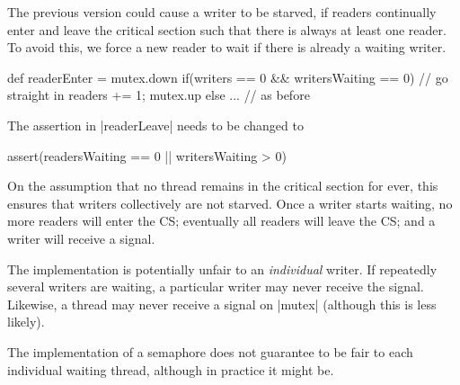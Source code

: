 
\begin{slide}

The previous version could cause a writer to be starved, if readers
continually enter and leave the critical section such that there is always at
least one reader.  To avoid this, we force a new reader to wait if there is
already a waiting writer.

\begin{scala}
  def readerEnter = {
    mutex.down
    if(writers == 0 && writersWaiting == 0){ // go straight in
      readers += 1; mutex.up
    }
    else{ ... } // as before
  }
\end{scala}

The assertion in |readerLeave| needs to be changed to 
\begin{scala}
  assert(readersWaiting == 0 || writersWaiting > 0)
\end{scala}
\end{slide}


\begin{slide}

On the assumption that no thread remains in the critical section for ever,
this ensures that writers collectively are not starved.  Once a writer starts
waiting, no more readers will enter the CS; eventually all readers will leave
the CS; and a writer will receive a signal.
\end{slide}


\begin{slide}

The implementation is potentially unfair to an \emph{individual} writer.  If
repeatedly several writers are waiting, a particular writer may never receive
the signal.  Likewise, a thread may never receive a signal on |mutex|
(although this is less likely). 

The implementation of a semaphore does not guarantee to be fair to each
individual waiting thread, although in practice it might be.


\end{slide}

